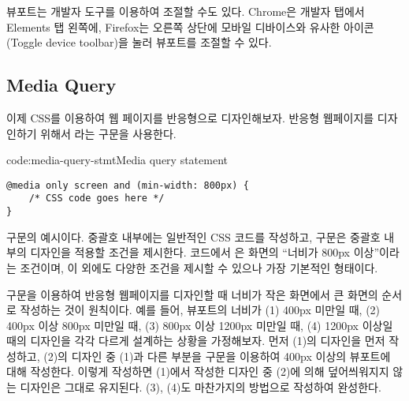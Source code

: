 뷰포트는 개발자 도구를 이용하여 조절할 수도 있다. Chrome은 개발자 탭에서 Elements 탭 왼쪽에, Firefox는 오른쪽 상단에 모바일 디바이스와 유사한 아이콘(Toggle device toolbar)을 눌러 뷰포트를 조절할 수 있다.

\subsection*{Media Query}
이제 CSS를 이용하여 웹 페이지를 반응형으로 디자인해보자. 반응형 웹페이지를 디자인하기 위해서 라는 구문을 사용한다.

\begin{code}{code:media-query-stmt}{Media query statement}
\begin{verbatim}
@media only screen and (min-width: 800px) {
    /* CSS code goes here */
}
\end{verbatim}
\end{code}

\는  구문의 예시이다. 중괄호 내부에는 일반적인 CSS 코드를 작성하고,  구문은 중괄호 내부의 디자인을 적용할 조건을 제시한다. 코드에서 은 화면의 ``너비가 800px 이상''이라는 조건이며, 이 외에도 다양한 조건을 제시할 수 있으나 \가 가장 기본적인 형태이다.

 구문을 이용하여 반응형 웹페이지를 디자인할 때 너비가 작은 화면에서 큰 화면의 순서로 작성하는 것이 원칙이다. 예를 들어, 뷰포트의 너비가 (1) 400px 미만일 때, (2) 400px 이상 800px 미만일 때, (3) 800px 이상 1200px 미만일 때, (4) 1200px 이상일 때의 디자인을 각각 다르게 설계하는 상황을 가정해보자. 먼저 (1)의 디자인을 먼저 작성하고, (2)의 디자인 중 (1)과 다른 부분을  구문을 이용하여 400px 이상의 뷰포트에 대해 작성한다. 이렇게 작성하면 (1)에서 작성한 디자인 중 (2)에 의해 덮어씌워지지 않는 디자인은 그대로 유지된다. (3), (4)도 마찬가지의 방법으로 작성하여 완성한다.
